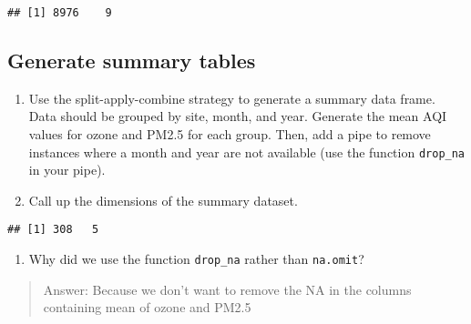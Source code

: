 \documentclass[]{article}
\newenvironment{Shaded}{\begin{snugshade}}{\end{snugshade}}
\newcommand{\CommentTok}[1]{\textcolor[rgb]{0.56,0.35,0.01}{\textit{#1}}}
\newcommand{\DataTypeTok}[1]{\textcolor[rgb]{0.13,0.29,0.53}{#1}}
\newcommand{\FloatTok}[1]{\textcolor[rgb]{0.00,0.00,0.81}{#1}}
\newcommand{\KeywordTok}[1]{\textcolor[rgb]{0.13,0.29,0.53}{\textbf{#1}}}
\newcommand{\NormalTok}[1]{#1}
\newcommand{\OperatorTok}[1]{\textcolor[rgb]{0.81,0.36,0.00}{\textbf{#1}}}
\newcommand{\OtherTok}[1]{\textcolor[rgb]{0.56,0.35,0.01}{#1}}
\newcommand{\StringTok}[1]{\textcolor[rgb]{0.31,0.60,0.02}{#1}}
\providecommand{\tightlist}{%
  \setlength{\itemsep}{0pt}\setlength{\parskip}{0pt}}
\begin{document}
\begin{verbatim}
## [1] 8976    9
\end{verbatim}

\begin{Shaded}
\end{Shaded}

\hypertarget{generate-summary-tables}{%
\subsection{Generate summary tables}\label{generate-summary-tables}}

\begin{enumerate}
\def\labelenumi{\arabic{enumi}.}
\setcounter{enumi}{11}
\item
  Use the split-apply-combine strategy to generate a summary data frame.
  Data should be grouped by site, month, and year. Generate the mean AQI
  values for ozone and PM2.5 for each group. Then, add a pipe to remove
  instances where a month and year are not available (use the function
  \texttt{drop\_na} in your pipe).
\item
  Call up the dimensions of the summary dataset.
\end{enumerate}

\begin{Shaded}
\end{Shaded}

\begin{verbatim}
## [1] 308   5
\end{verbatim}

\begin{enumerate}
\def\labelenumi{\arabic{enumi}.}
\setcounter{enumi}{13}
\tightlist
\item
  Why did we use the function \texttt{drop\_na} rather than
  \texttt{na.omit}?
\end{enumerate}

\begin{quote}
Answer: Because we don't want to remove the NA in the columns containing
mean of ozone and PM2.5
\end{quote}
\end{document}
